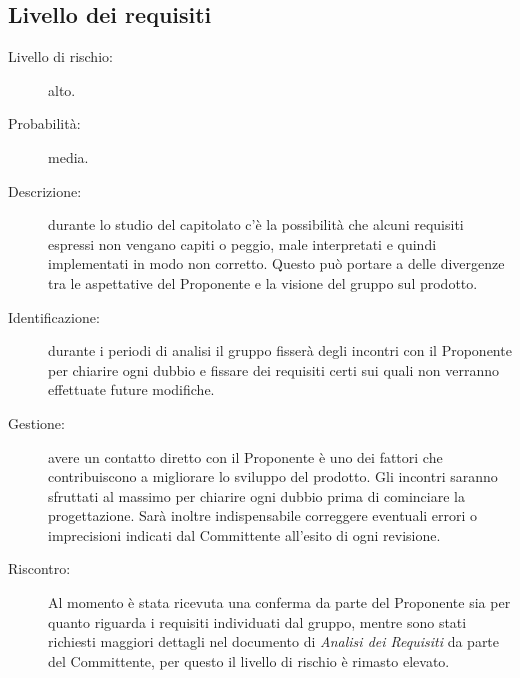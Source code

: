 \subsection{Livello dei requisiti}
\begin{description}
	\item[Livello di rischio:] alto.
	\item[Probabilità:] media.
	\item[Descrizione:] durante lo studio del capitolato c'è la possibilità che alcuni requisiti espressi non vengano capiti o peggio, male interpretati e quindi implementati in modo non corretto. Questo può portare a delle divergenze tra le aspettative del Proponente e la visione del gruppo sul prodotto. 
	\item[Identificazione:] durante i periodi di analisi il gruppo fisserà degli incontri con il Proponente per chiarire ogni dubbio e fissare dei requisiti certi sui quali non verranno effettuate future modifiche.
	\item[Gestione:] avere un contatto diretto con il Proponente è uno dei fattori che contribuiscono a migliorare lo sviluppo del prodotto. Gli incontri saranno sfruttati al massimo per chiarire ogni dubbio prima di cominciare la progettazione. Sarà inoltre indispensabile correggere eventuali errori o imprecisioni indicati dal Committente all'esito di ogni revisione.
	\item[Riscontro:] Al momento è stata ricevuta una conferma da parte del Proponente sia per quanto riguarda i requisiti individuati dal gruppo, mentre sono stati richiesti maggiori dettagli nel documento di \textit{Analisi dei Requisiti} da parte del Committente, per questo il livello di rischio è rimasto elevato.
\end{description}

